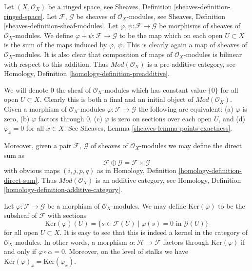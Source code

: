 \noindent
Let $(X, \mathcal{O}_X)$ be a ringed space, see
Sheaves, Definition \ref{sheaves-definition-ringed-space}.
Let $\mathcal{F}$, $\mathcal{G}$ be sheaves of $\mathcal{O}_X$-modules, see
Sheaves, Definition \ref{sheaves-definition-sheaf-modules}.
Let $\varphi, \psi : \mathcal{F} \to \mathcal{G}$
be morphisms of sheaves of $\mathcal{O}_X$-modules.
We define $\varphi + \psi : \mathcal{F} \to \mathcal{G}$
to be the map which on each open $U \subset X$ is the
sum of the maps induced by $\varphi$, $\psi$. This is
clearly again a map of sheaves of $\mathcal{O}_X$-modules.
It is also clear that composition of maps of
$\mathcal{O}_X$-modules is bilinear with respect to this
addition. Thus $\textit{Mod}(\mathcal{O}_X)$ is a pre-additive
category, see Homology, Definition \ref{homology-definition-preadditive}.

\medskip\noindent
We will denote $0$ the sheaf of $\mathcal{O}_X$-modules
which has constant value $\{0\}$ for all open $U \subset X$.
Clearly this is both a final and an initial object of
$\textit{Mod}(\mathcal{O}_X)$. Given a morphism
of $\mathcal{O}_X$-modules $\varphi : \mathcal{F} \to \mathcal{G}$
the following are equivalent:
(a) $\varphi$ is zero, (b) $\varphi$ factors through $0$,
(c) $\varphi$ is zero on sections over each open $U$, and
(d) $\varphi_x = 0$ for all $x \in X$. See
Sheaves, Lemma \ref{sheaves-lemma-points-exactness}.

\medskip\noindent
Moreover, given a pair
$\mathcal{F}$, $\mathcal{G}$ of sheaves of $\mathcal{O}_X$-modules
we may define the direct sum as
$$
\mathcal{F} \oplus \mathcal{G} = \mathcal{F} \times \mathcal{G}
$$
with obvious maps $(i, j, p, q)$ as in Homology, Definition
\ref{homology-definition-direct-sum}. Thus $\textit{Mod}(\mathcal{O}_X)$
is an additive category, see
Homology, Definition \ref{homology-definition-additive-category}.

\medskip\noindent
Let $\varphi : \mathcal{F} \to \mathcal{G}$ be a morphism
of $\mathcal{O}_X$-modules. We may define $\text{Ker}(\varphi)$
to be the subsheaf of $\mathcal{F}$ with sections
$$
\text{Ker}(\varphi)(U) =
\{ s \in \mathcal{F}(U) \mid \varphi(s) = 0 \text{ in } \mathcal{G}(U)\}
$$
for all open $U \subset X$. It is easy to see that this is indeed
a kernel in the category of $\mathcal{O}_X$-modules. In other words,
a morphism $\alpha : \mathcal{H} \to \mathcal{F}$ factors
through $\text{Ker}(\varphi)$ if and only if $\varphi \circ \alpha = 0$.
Moreover, on the level of stalks we have
$\text{Ker}(\varphi)_x = \text{Ker}(\varphi_x)$.


